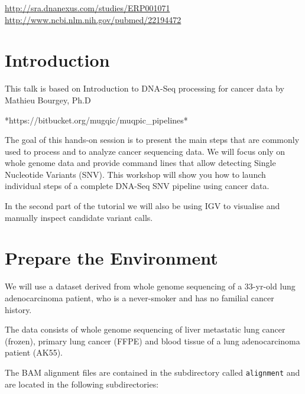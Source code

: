 \url{http://sra.dnanexus.com/studies/ERP001071}\\
\url{http://www.ncbi.nlm.nih.gov/pubmed/22194472}


\newpage


\section{Introduction}

This talk is based on Introduction to DNA-Seq processing for cancer data by Mathieu Bourgey, Ph.D  

*https://bitbucket.org/mugqic/muqpic\_pipelines*

The goal of this hands-on session is to present the main steps that are commonly used to process and to analyze cancer sequencing data. We will focus only on whole genome data and provide command lines that allow detecting Single Nucleotide Variants (SNV). This workshop will show you how to launch individual steps of a complete DNA-Seq SNV pipeline using cancer data.

In the second part of the tutorial we will also be using IGV to visualise and manually inspect candidate variant calls.


\section{Prepare the Environment}

We will use a dataset derived from whole genome sequencing of a 33-yr-old lung adenocarcinoma patient, who is a never-smoker and has no familial cancer history.

The data consists of whole genome sequencing of liver metastatic lung cancer (frozen), primary lung cancer (FFPE) and blood tissue of a lung adenocarcinoma patient (AK55).

The BAM alignment files are contained in the subdirectory called \texttt{alignment} and are located in the following subdirectories:

